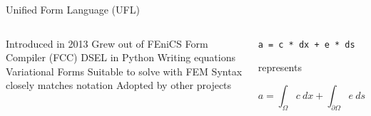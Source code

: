 \begin{frame}{Unified Form Language (UFL)}
\begin{columns}
\centering
\begin{outline}
  \1 Introduced in 2013
  \2 Grew out of FEniCS Form Compiler (FCC)
  \1 DSEL in Python
  \1 Writing equations
  \2 Variational Forms
  \2 Suitable to solve with FEM
  \2 Syntax closely matches notation
  \1 Adopted by other projects
\end{outline}

\begin{center}
\centering
\lstinline{a = c * dx + e * ds}

\vspace{0.2cm}

represents

$$a = \int_{\Omega} c \ dx + \int_{\partial \Omega} e \ ds$$
\end{center}
\end{columns}
\end{frame}
